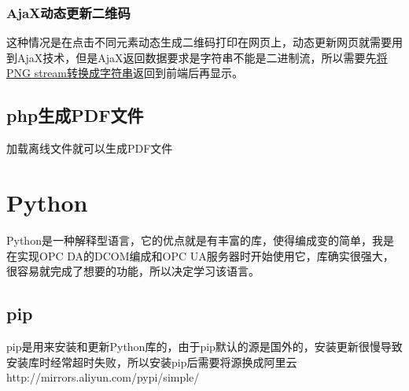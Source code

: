 \subsubsection{AjaX动态更新二维码}
这种情况是在点击不同元素动态生成二维码打印在网页上，动态更新网页就需要用到AjaX技术，但是AjaX返回数据要求是字符串不能是二进制流，所以需要先\href{https://blog.csdn.net/LJFPHP/article/details/79111844}{将PNG stream转换成字符串}返回到前端后再显示。
\subsection{php生成PDF文件}
加载离线文件就可以生成PDF文件
\section{Python}
Python是一种解释型语言，它的优点就是有丰富的库，使得编成变的简单，我是在实现OPC DA的DCOM编成和OPC UA服务器时开始使用它，库确实很强大，很容易就完成了想要的功能，所以决定学习该语言。
\subsection{pip}
pip是用来安装和更新Python库的，由于pip默认的源是国外的，安装更新很慢导致安装库时经常超时失败，所以安装pip后需要将源换成阿里云 http://mirrors.aliyun.com/pypi/simple/


